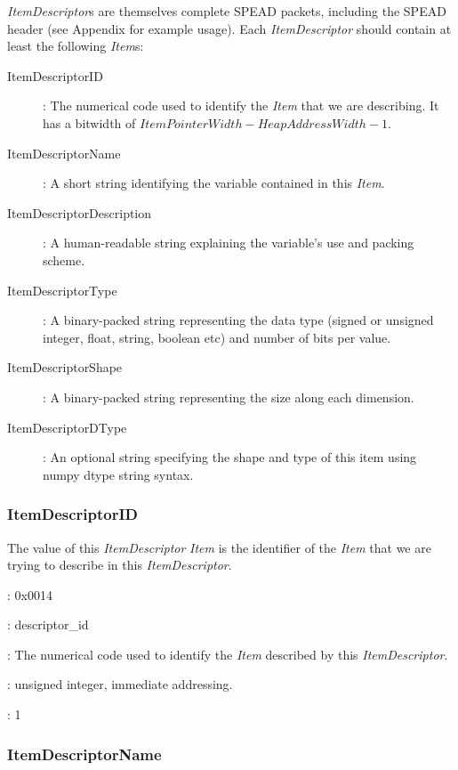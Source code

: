 \documentclass[11pt,english,twoside]{article}
\begin{document}
\emph{ItemDescriptor}s are themselves complete SPEAD packets, including the SPEAD header (see Appendix for example usage). Each \emph{ItemDescriptor} should contain at least the
following \emph{Item}s:

\begin{description}
\item[ItemDescriptorID]: The numerical code used to identify the \emph{Item} that we are describing. It has a bitwidth of $ItemPointerWidth -
HeapAddressWidth - 1$.
\item[ItemDescriptorName]: A short string identifying the variable contained in this \emph{Item}.
\item[ItemDescriptorDescription]: A human-readable string explaining the variable's use and packing scheme.
\item[ItemDescriptorType]: A binary-packed string representing the data type (signed or unsigned integer, float, string, boolean etc) and number
of bits per value.
\item[ItemDescriptorShape]: A binary-packed string representing the size along each dimension.
\item[ItemDescriptorDType]: An optional string specifying the shape and type of this item using numpy dtype string syntax.
\end{description}


\subsubsection{ItemDescriptorID}

The value of this \emph{ItemDescriptor} \emph{Item} is the identifier of the \emph{Item} that we are trying to describe in this
\emph{ItemDescriptor}.

\begin{description}
\setlength{\itemindent}{0.5cm}
\setlength{\itemsep}{0ex plus0.2ex}
\item[Numerical Identifier]: 0x0014
\item[Name]: descriptor\_id
\item[Description]: The numerical code used to identify the \emph{Item} described by this \emph{ItemDescriptor}.
\item[Type]: unsigned integer, immediate addressing.
\item[Shape]: 1
\end{description}

\subsubsection{ItemDescriptorName}
\end{document}
